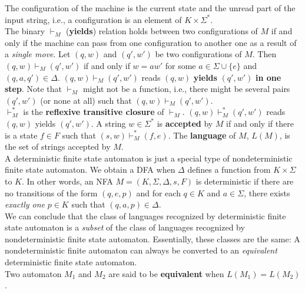 \newpage
\begin{multicols}{2}
\setlength{\columnsep}{1.5cm}
\setlength{\columnseprule}{0.2pt}
  The configuration of the machine is the current state and the unread part of the input string, i.e., a configuration is an element of $K \times \Sigma^*$.\\

  The binary $\vdash_M$ (\textbf{yields}) relation holds between two configurations of $M$ if and only if the machine can pass from one configuration to another one as a result of a \textit{single move}. Let $(q, w)$ and $(q', w')$ be two configurations of $M$. Then $(q, w) \vdash_M (q', w')$ if and only if $w = aw'$ for some $a \in \Sigma \cup \{e\}$ and $(q, a, q') \in \Delta$. $(q, w) \vdash_M (q', w')$ reads $(q, w)$ \textbf{yields} $(q', w')$ \textbf{in one step}. Note that $\vdash_M$ might not be a function, i.e., there might be several pairs $(q', w')$ (or none at all) such that $(q, w) \vdash_M (q', w')$.\\

  $\vdash^*_M$ is the \textbf{reflexive transitive closure} of $\vdash_M$. $(q, w) \vdash^*_M (q', w')$ reads $(q, w)$ yields $(q', w')$. A string $w \in \Sigma^*$ is \textbf{accepted} by $M$ if and only if there is a state $f \in F$ such that $(s, w) \vdash^*_M (f, e)$. The \textbf{language} of $M$, $L(M)$, is the set of strings accepted by $M$.\\

  A deterministic finite state automaton is just a special type of nondeterministic finite state automaton. We obtain a DFA when $\Delta$ defines a function from $K \times \Sigma$ to $K$. In other words, an NFA $M = (K, \Sigma, \Delta, s, F)$ is deterministic if there are no transitions of the form $(q, e, p)$ and for each $q \in K$ and $a \in \Sigma$, there exists \textit{exactly one} $p \in K$ such that $(q, a, p) \in \Delta$.\\

  We can conclude that the class of languages recognized by deterministic finite state automaton is a \textit{subset} of the class of languages recognized by nondeterministic finite state automaton. Essentially, these classes are the same: A nondeterministic finite automaton can always be
  converted to an \textit{equivalent} deterministic finite state automaton.\\

  Two automaton $M_1$ and $M_2$ are said to be \textbf{equivalent} when $L(M_1) = L(M_2)$.
\end{multicols}


